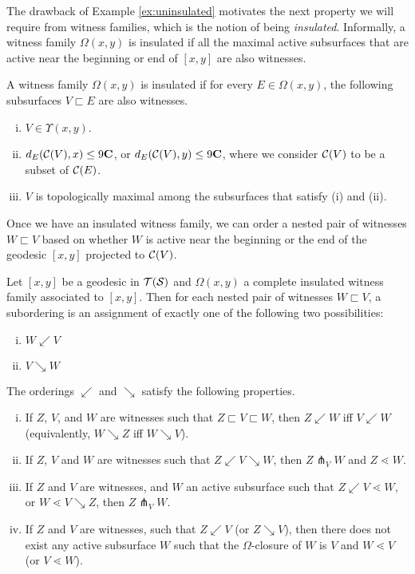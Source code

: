   The drawback of Example \ref{ex:uninsulated} motivates the next property we will require from witness families, which is the notion of being \emph{insulated}.
  Informally, a witness family $\Omega(x,y)$ is insulated if all the maximal active subsurfaces that are active near the beginning or end of $[x,y]$ are also witnesses.
  \begin{definition}
    \label{def:insulated}
    A witness family $\Omega(x,y)$ is insulated if for every $E \in \Omega(x,y)$, the following subsurfaces $V \sqsubset E$ are also witnesses.
    \begin{enumerate}[(i)]
    \item $V \in \Upsilon(x,y)$.
    \item $d_E(\mathcal{C}(V), x) \leq 9\mathbf{C}$, or $d_E(\mathcal{C}(V), y) \leq 9 \mathbf{C}$, where we consider $\mathcal{C}(V)$ to be a subset of $\mathcal{C}(E)$.
    \item $V$ is topologically maximal among the subsurfaces that satisfy (i) and (ii).
    \end{enumerate}
  \end{definition}

  Once we have an insulated witness family, we can order a nested pair of witnesses $W \sqsubset V$ based on whether $W$ is active near the beginning or the end of the geodesic $[x,y]$ projected to $\mathcal{C}(V)$.

  \begin{definition}[Subordering]
    Let $[x,y]$ be a geodesic in $\mathcal{T}(\mathcal{S})$ and $\Omega(x,y)$ a complete insulated witness family associated to $[x,y]$.
    Then for each nested pair of witnesses $W \sqsubset V$, a subordering is an assignment of exactly one of the following two possibilities:
    \begin{enumerate}[(i)]
    \item $W \swarrow V$
    \item $V \searrow W$
    \end{enumerate}
    The orderings $\swarrow$ and $\searrow$ satisfy the following properties.
    \begin{enumerate}[(i)]
    \item If $Z$, $V$, and $W$ are witnesses such that $Z \sqsubset V \sqsubset W$, then $Z \swarrow W$ iff $V \swarrow W$ (equivalently, $W \searrow Z$ iff $W \searrow V$).
    \item If $Z$, $V$ and $W$ are witnesses such that $Z \swarrow V \searrow W$, then $Z \pitchfork_V W$ and $Z \lessdot W$.
    \item If $Z$ and $V$ are witnesses, and $W$ an active subsurface such that $Z \swarrow V \lessdot W$, or $W \lessdot V \searrow Z$, then $Z \pitchfork_V W$.
    \item If $Z$ and $V$ are witnesses, such that $Z \swarrow V$ (or $Z \searrow V$), then there does not exist any active subsurface $W$ such that the $\Omega$-closure of $W$ is $V$ and $W \lessdot V$ (or $V \lessdot W$).
    \end{enumerate}
  \end{definition}

